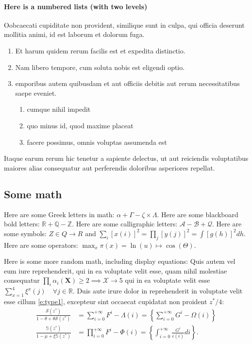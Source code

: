 \documentclass[letterpaper,12pt,leqno]{article}
\begin{document}
\paragraph{Here is a numbered lists (with two levels)} Oobcaecati cupiditate non provident, similique sunt in culpa, qui officia deserunt mollitia animi, id est laborum et dolorum fuga.
\begin{enumerate}
\item Et harum quidem rerum facilis est et expedita distinctio.
\item Nam libero tempore, cum soluta nobis est eligendi optio.
\item emporibus autem quibusdam et aut officiis debitis aut rerum necessitatibus saepe eveniet.
\begin{enumerate}
	\item cumque nihil impedit
	\item quo minus id, quod maxime placeat
	\item facere possimus, omnis voluptas assumenda est
\end{enumerate}
\end{enumerate}
Itaque earum rerum hic tenetur a sapiente delectus, ut aut reiciendis voluptatibus maiores alias consequatur aut perferendis doloribus asperiores repellat. 

\subsection{Some math} 

Here are some Greek letters in math: $\alpha + \Gamma - \zeta \times \Lambda$. Here are some blackboard bold letters: $\mathbb{R} + \mathbb{Q} - \mathbb{Z}$. Here are some calligraphic letters: $\mathcal{A} - \mathcal{B} + \mathcal{Q}$. Here are some symbols: $Z \in Q \to R$ and $\sum_i [x(i)]^2 = \prod_j [y(j)]^2 = \int [g(h)]^2dh $. Here are some operators: $\max_x \pi(x) = \ln(u) \mapsto \cos(\Theta)$.

Here is some more random math, including display equations: Quis autem vel eum iure reprehenderit, qui in ea voluptate velit esse, quam nihil molestiae consequatur $\prod_i\alpha_i(\bm{X}) \geq 2 \implies \mathcal{X} \to 5$ qui in ea voluptate velit esse $\sum_{x=1}^4 \xi^x(j) \quad \forall j\in \mathbb{R}$. Duis aute irure dolor in reprehenderit in voluptate velit esse cillum \eqref{e:type1}, excepteur sint occaecat cupidatat non proident $z^\ast/4$:
\begin{align*}
\frac{\mathcal{S}(z^*)}{1 -\theta + \theta \mathcal{S}(z^*)} &= \sum_{i=0}^{+\infty}F^{i} - \Lambda(i) = \left\lbrace\sum_{i=0}^{+\infty}G^{i} - \Omega(i)\right\rbrace\\
\frac{\mathbb{S}(z^*)}{1 -\mu + \xi \mathbb{S}(z^*)} &= \prod_{i=0}^{+\infty}F^{i} - \Phi(i) = \left\lbrace\int_{i=0}^{+\infty}\frac{G^{i}}{\epsilon(i)} di\right\rbrace.
\end{align*}
\end{document}
